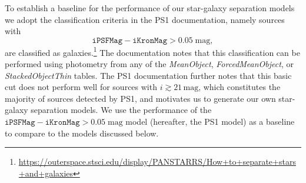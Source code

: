 \documentclass[twocolumn]{aastex62}
\begin{document}
To establish a baseline for the performance of our star-galaxy separation models we adopt the classification criteria in the PS1 documentation, namely sources with
$$ \mathtt{iPSFMag} - \mathtt{iKronMag} > 0.05\;\mathrm{mag},$$
are classified as galaxies.\footnote{\url{https://outerspace.stsci.edu/display/PANSTARRS/How+to+separate+stars+and+galaxies}} The documentation notes that this classification can be performed using photometry from any of the \textit{MeanObject}, \textit{ForcedMeanObject}, or \textit{StackedObjectThin} tables. The PS1 documentation further notes that this basic cut does not perform well for sources with $i \gtrsim 21\,\mathrm{mag}$, which constitutes the majority of sources detected by PS1, and motivates us to generate our own star-galaxy separation models. We use the performance of the $\mathtt{iPSFMag} - \mathtt{iKronMag} > 0.05\;\mathrm{mag}$ model (hereafter, the PS1 model) as a baseline to compare to the models discussed below.
\end{document}
